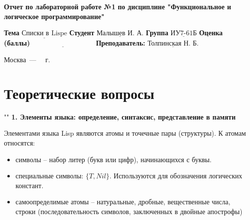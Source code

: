 \documentclass[12pt]{report}
\begin{document}
\begin{titlepage}
	
	\begin{center}
		\noindent\begin{minipage}{1.3\textwidth}\centering
			\Large\textbf{  Отчет по лабораторной работе №1}\newline
			\textbf{по дисциплине \newline "Функциональное и логическое программирование"}\newline\newline
		\end{minipage}
	\end{center}
	
	\noindent\textbf{Тема} $\underline{\text{Списки в Lispe}}$\newline\newline
	\noindent\textbf{Студент} $\underline{\text{Малышев И. А.}}$\newline\newline
	\noindent\textbf{Группа} $\underline{\text{ИУ7-61Б}}$\newline\newline
	\noindent\textbf{Оценка (баллы)} $\underline{\text{~~~~~~~~~~~~~~~~~~~~~~~~~~~}}$\newline\newline
	\noindent\textbf{Преподаватель: } $\underline{\text{Толпинская Н. Б.}}$\newline\newline\newline
	
	\begin{center}
		\vfill
		Москва~---~\the\year
		~г.
	\end{center}
\end{titlepage}

\chapter*{Теоретические вопросы}
""\newline
\textbf{1. Элементы языка: определение, синтаксис, представление в памяти}

Элементами языка Lisp являются атомы и точечные пары (структуры). К атомам относятся:

\begin{itemize}
	\item символы -- набор литер (букв или цифр), начинающихся с буквы.
	\item специальные символы: $\{T, Nil\}$. Используются для обозначения логических констант.
	\item самоопределимые атомы -- натуральные, дробные, вещественные числа, строки (последовательность символов, заключенных в двойные апострофы)
\end{itemize}
\end{document}
